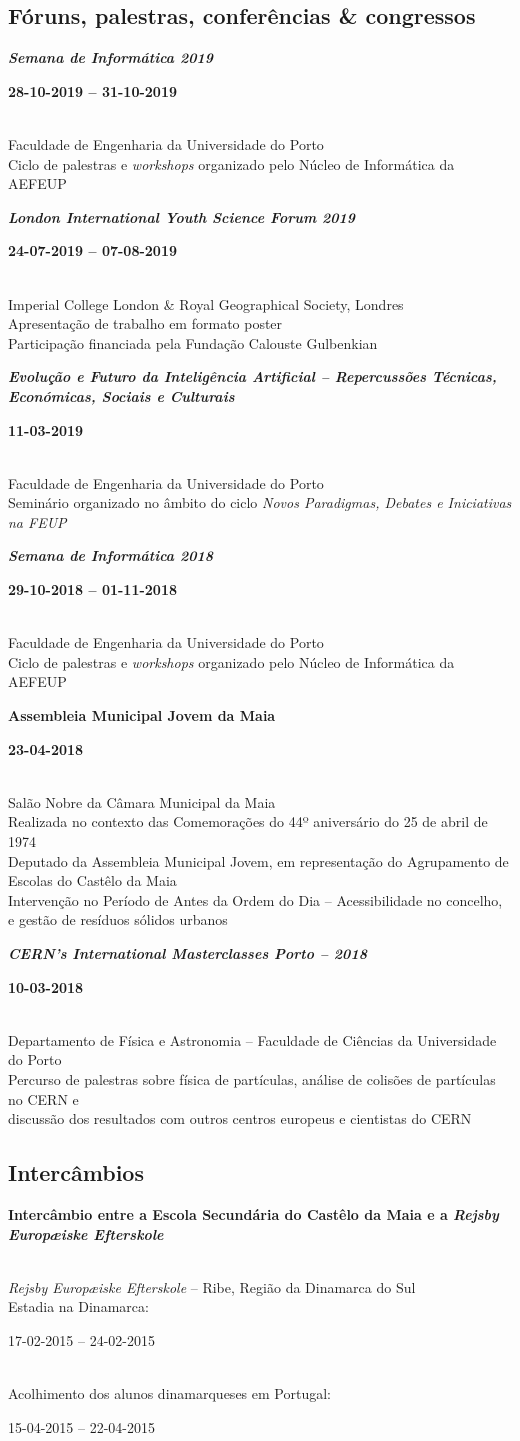 \documentclass[8pt]{extarticle}
\newcommand{\parag}[1]{
\begin{minipage}{\textwidth} \hfill
\begin{minipage}{\dimexpr\textwidth-0.6cm}
	#1
\end{minipage}
\end{minipage}
}
\newcommand{\itemtime}[2]{
#1 \hfill \begin{minipage}[t]{0.185\textwidth}         #2  \end{minipage}
}
\newcommand{\job}[3]{\parag{
\itemtime{\textbf{#1}}{\textbf{#2}}\\
#3 \vspace*{9px}}}
\begin{document}
\subsection*{Fóruns, palestras, conferências \& congressos}
\job{\textit{Semana de Informática 2019}}{28-10-2019 – 31-10-2019}{
Faculdade de Engenharia da Universidade do Porto\\
Ciclo de palestras e \textit{workshops} organizado pelo Núcleo de Informática da AEFEUP
}
\job{\textit{London International Youth Science Forum 2019}}{24-07-2019 – 07-08-2019}{
Imperial College London \& Royal Geographical Society, Londres\\
Apresentação de trabalho em formato poster\\
Participação financiada pela Fundação Calouste Gulbenkian
}
\job{\textit{Evolução e Futuro da Inteligência Artificial – Repercussões Técnicas, Económicas, Sociais e Culturais}}{11-03-2019}{
Faculdade de Engenharia da Universidade do Porto\\
Seminário organizado no âmbito do ciclo \textit{Novos Paradigmas, Debates e Iniciativas na FEUP}
}
\job{\textit{Semana de Informática 2018}}{29-10-2018 – 01-11-2018}{
Faculdade de Engenharia da Universidade do Porto\\
Ciclo de palestras e \textit{workshops} organizado pelo Núcleo de Informática da AEFEUP
}
\job{Assembleia Municipal Jovem da Maia}{23-04-2018}{
Salão Nobre da Câmara Municipal da Maia\\
Realizada no contexto das Comemorações do 44º aniversário do 25 de abril de 1974\\
Deputado da Assembleia Municipal Jovem, em representação do Agrupamento de Escolas do Castêlo da Maia\\
Intervenção no Período de Antes da Ordem do Dia – Acessibilidade no concelho, e gestão de
resíduos sólidos urbanos
}
\job{\textit{CERN’s International Masterclasses Porto – 2018}}{10-03-2018}{
Departamento de Física e Astronomia – Faculdade de Ciências da Universidade do Porto\\
Percurso de palestras sobre física de partículas, análise de colisões de partículas no CERN e\\
discussão dos resultados com outros centros europeus e cientistas do CERN
}
\subsection*{Intercâmbios}
\job{Intercâmbio entre a Escola Secundária do Castêlo da Maia e a \textit{Rejsby Europæiske Efterskole}}{}{
\textit{Rejsby Europæiske Efterskole} – Ribe, Região da Dinamarca do Sul\\
\itemtime{Estadia na Dinamarca:}{17-02-2015 – 24-02-2015}\\
\itemtime{Acolhimento dos alunos dinamarqueses em Portugal:}{15-04-2015 – 22-04-2015}\\
}
\end{document}
